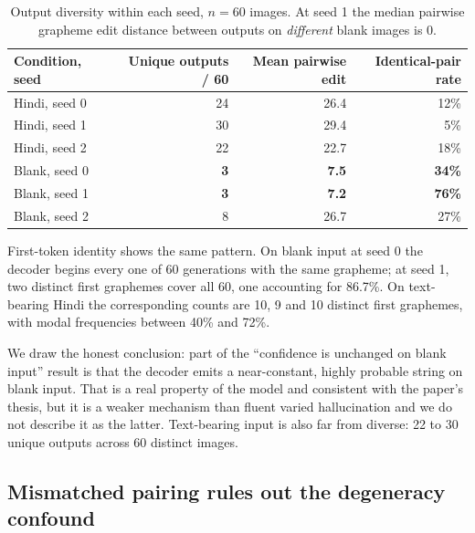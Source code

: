 \documentclass{article}
\begin{document}
\begin{table}[h]
\small
\centering
\caption{Output diversity within each seed, $n=60$ images. At seed 1 the median pairwise
grapheme edit distance between outputs on \emph{different} blank images is 0.}
\label{tab:degeneracy}
\begin{tabular}{lrrr}
\toprule
Condition, seed & Unique outputs / 60 & Mean pairwise edit & Identical-pair rate \\
\midrule
Hindi, seed 0 & 24 & 26.4 & 12\% \\
Hindi, seed 1 & 30 & 29.4 & 5\%  \\
Hindi, seed 2 & 22 & 22.7 & 18\% \\
Blank, seed 0 & \textbf{3}  & \textbf{7.5}  & \textbf{34\%} \\
Blank, seed 1 & \textbf{3}  & \textbf{7.2}  & \textbf{76\%} \\
Blank, seed 2 & 8  & 26.7 & 27\% \\
\bottomrule
\end{tabular}
\end{table}

First-token identity shows the same pattern. On blank input at seed 0 the decoder begins every
one of 60 generations with the same grapheme; at seed 1, two distinct first graphemes cover
all 60, one accounting for 86.7\%. On text-bearing Hindi the corresponding counts are 10, 9 and 10
distinct first graphemes, with modal frequencies between 40\% and 72\%.

We draw the honest conclusion: part of the ``confidence is unchanged on blank input'' result
is that the decoder emits a near-constant, highly probable string on blank input. That is a
real property of the model and consistent with the paper's thesis, but it is a weaker
mechanism than fluent varied hallucination and we do not describe it as the latter. Text-bearing input
is also far from diverse: 22 to 30 unique outputs across 60 distinct images.

\subsection{Mismatched pairing rules out the degeneracy confound}
\label{sec:mismatch}
\end{document}

